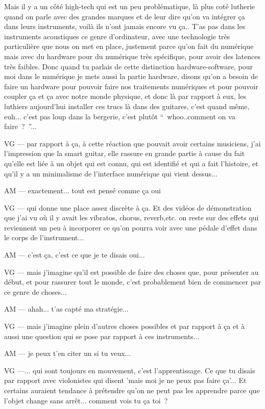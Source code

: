 Mais il y a un côté high-tech qui est un peu problématique, là plus coté lutherie quand on parle avec des grandes marques et de leur dire qu'on va intégrer ça dans leurs instruments, voilà ils n'ont jamais encore vu ça.. 
T'as pas dans les instruments acoustiques ce genre d'ordinateur, avec une technologie très particulière que nous on met en place, justement parce qu'on fait du numérique mais avec du hardware pour du numérique très spécifique, pour avoir des latences très faibles. 
Donc quand tu parlais de cette distinction hardware-software, pour moi dans le numérique je mets aussi la partie hardware, disons qu'on a besoin de faire un hardware pour pouvoir faire nos traitements numériques et pour pouvoir coupler ça et ça avec notre monde physique, et donc là par rapport à eux, les luthiers aujourd'hui installer ces trucs là dans des guitares, c'est quand même, euh... c'est pas loup dans la bergerie, c'est plutôt “ whoo..comment on va faire ? ”... 

VG — par rapport à ça, à cette réaction que pouvait avoir certains musiciens, j'ai l'impression que la smart guitar, elle rassure en grande partie à cause du fait qu'elle est liée à un objet qui est connu, qui est identifié et qui a fait l'histoire, et qu'il y a un minimalisme de l'interface numérique qui vient dessus... 

AM — exactement... tout est pensé comme ça oui

VG — qui donne une place assez discrète à ça. Et des vidéos de démonstration que j'ai vu où il y avait les vibratos, chorus, reverb,etc. on reste sur des effets qui reviennent un peu à incorporer ce qu'on pourra voir avec une pédale d'effet dans le corps de l'instrument... 

AM — c'est ça, c'est ce que je te disais oui... 

VG —  mais j'imagine qu'il est possible de faire des choses que, pour présenter au début, et pour rassurer tout le monde, c'est probablement bien de commencer par ce genre de choses... 

AM — ahah... t'as capté ma stratégie... 

VG — mais j'imagine plein d'autres choses possibles et par rapport à ça et à aussi une question qui se pose par rapport à ces instruments... 

AM — je peux t'en citer un si tu veux... 

VG —... qui sont toujours en mouvement, c'est l'apprentissage. Ce que tu disais par rapport avec violonistes qui disent 'mais moi je ne peux pas faire ça'... Et certains auraient tendance à prétendre qu'on ne peut pas les apprendre parce que l'objet change sans arrêt... comment vois tu ça toi ?

